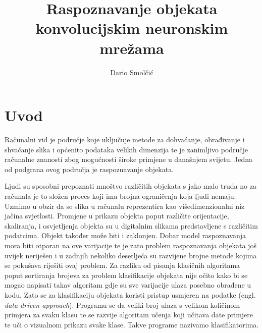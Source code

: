 \documentclass[times, utf8, zavrsni, numeric]{fer}
\begin{document}

\title{Raspoznavanje objekata konvolucijskim neuronskim mrežama}

\author{Dario Smolčić}

\maketitle

\izvornik

\zahvala{}

\tableofcontents

\chapter{Uvod}
Računalni vid je područje koje uključuje metode za dohvaćanje, obrađivanje i shvaćanje slika i općenito podataka velikih dimenzija te je zanimljivo područje računalne znanosti zbog mogućnosti široke primjene u današnjem svijetu. Jedna od podgrana ovog područja je raspoznavanje objekata.

Ljudi su sposobni prepoznati mnoštvo različitih objekata s jako malo truda no za računala je to složen proces koji ima brojna ograničenja koja ljudi nemaju. Uzmimo u obzir da se slika u računalu reprezentira kao višedimenzionalni niz jačina svjetlosti. Promjene u prikazu objekta poput različite orijentacije, skaliranja, i osvjetljenja objekta su u digitalnim slikama predstavljene s različitim podatcima. Objekt također može biti i zaklonjen. Dobar model raspoznavanja mora biti otporan na ove varijacije te je zato problem raspoznavanja objekata još uvijek neriješen i u zadnjih nekoliko desetljeća su razvijene brojne metode kojima se pokušava riješiti ovaj problem.
Za razliku od pisanja klasičnih algoritama poput sortiranja brojeva za problem klasifikacije objekata nije očito kako bi se mogao napisati takav algoritam gdje su sve varijacije ulaza posebno obrađene u kodu. Zato se za klasifikaciju objekata koristi pristup usmjeren na podatke (engl. \textit{data-driven approach}). Programu se da veliki broj ulaza s velikom količinom primjera za svaku klasu te se razvije algoritam učenja koji učitava date primjere te uči o vizualnom prikazu svake klase. Takve programe nazivamo klasifikatorima.
\end{document}
